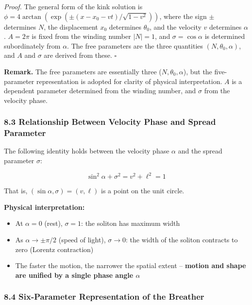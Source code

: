 \documentclass[a4paper,11pt]{article}
\providecommand{\tightlist}{\setlength{\itemsep}{0pt}\setlength{\parskip}{0pt}}
\begin{document}
\emph{Proof.} The general form of the kink solution is
\(\phi = 4\arctan(\exp(\pm(x - x_0 - vt)/\sqrt{1-v^2}))\), where the
sign \(\pm\) determines \(N\), the displacement \(x_0\) determines
\(\theta_0\), and the velocity \(v\) determines \(\alpha\). \(A = 2\pi\)
is fixed from the winding number \(|N| = 1\), and
\(\sigma = \cos\alpha\) is determined subordinately from \(\alpha\). The
free parameters are the three quantities \((N, \theta_0, \alpha)\), and
\(A\) and \(\sigma\) are derived from these. \(\square\)

\textbf{Remark.} The free parameters are essentially three
(\(N, \theta_0, \alpha\)), but the five-parameter representation is
adopted for clarity of physical interpretation. \(A\) is a dependent
parameter determined from the winding number, and \(\sigma\) from the
velocity phase.

\subsubsection{8.3 Relationship Between Velocity Phase and Spread
Parameter}\label{relationship-between-velocity-phase-and-spread-parameter}

The following identity holds between the velocity phase \(\alpha\) and
the spread parameter \(\sigma\):

\[\sin^2\alpha + \sigma^2 = v^2 + \ell^2 = 1\]

That is, \((\sin\alpha, \sigma) = (v, \ell)\) is a point on the unit
circle.

\textbf{Physical interpretation:}

\begin{itemize}
\tightlist
\item
  At \(\alpha = 0\) (rest), \(\sigma = 1\): the soliton has maximum
  width
\item
  As \(\alpha \to \pm\pi/2\) (speed of light), \(\sigma \to 0\): the
  width of the soliton contracts to zero (Lorentz contraction)
\item
  The faster the motion, the narrower the spatial extent --
  \textbf{motion and shape are unified by a single phase angle
  \(\alpha\)}
\end{itemize}

\subsubsection{8.4 Six-Parameter Representation of the
Breather}\label{six-parameter-representation-of-the-breather}
\end{document}
